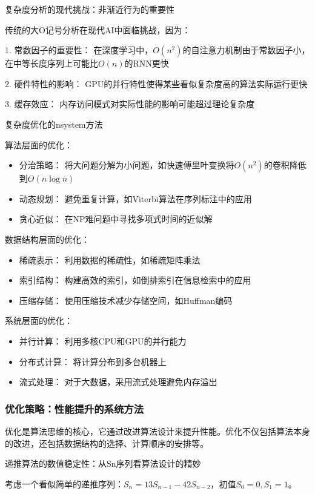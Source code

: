 复杂度分析的现代挑战：非渐近行为的重要性

传统的大O记号分析在现代AI中面临挑战，因为：

1. 常数因子的重要性： 在深度学习中，$O(n^2)$的自注意力机制由于常数因子小，在中等长度序列上可能比$O(n)$的RNN更快

2. 硬件特性的影响： GPU的并行特性使得某些看似复杂度高的算法实际运行更快

3. 缓存效应： 内存访问模式对实际性能的影响可能超过理论复杂度

复杂度优化的nsystem方法

算法层面的优化：
\begin{itemize}
\item 分治策略： 将大问题分解为小问题，如快速傅里叶变换将$O(n^2)$的卷积降低到$O(n \log n)$
\item 动态规划： 避免重复计算，如Viterbi算法在序列标注中的应用
\item 贪心近似： 在NP难问题中寻找多项式时间的近似解
\end{itemize}

数据结构层面的优化：
\begin{itemize}
\item 稀疏表示： 利用数据的稀疏性，如稀疏矩阵乘法
\item 索引结构： 构建高效的索引，如倒排索引在信息检索中的应用
\item 压缩存储： 使用压缩技术减少存储空间，如Huffman编码
\end{itemize}

系统层面的优化：
\begin{itemize}
\item 并行计算： 利用多核CPU和GPU的并行能力
\item 分布式计算： 将计算分布到多台机器上
\item 流式处理： 对于大数据，采用流式处理避免内存溢出
\end{itemize}

\subsubsection{优化策略：性能提升的系统方法}

优化是算法思维的核心，它通过改进算法设计来提升性能。优化不仅包括算法本身的改进，还包括数据结构的选择、计算顺序的安排等。

递推算法的数值稳定性：从Sn序列看算法设计的精妙

考虑一个看似简单的递推序列：$S_n = 13S_{n-1} - 42S_{n-2}$，初值$S_0 = 0, S_1 = 1$。

